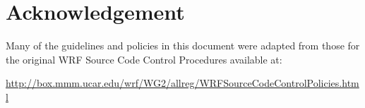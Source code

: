 %
%
%
%
%
%
%
%

\section*{Acknowledgement}
Many of the guidelines and policies in this document were adapted from those for the original WRF Source Code Control Procedures available at:

\href{http://box.mmm.ucar.edu/wrf/WG2/allreg/WRFSourceCodeControlPolicies.html}{http://box.mmm.ucar.edu/wrf/WG2/allreg/WRFSourceCodeControlPolicies.html}





\begin{appendix}
\end{appendix}



